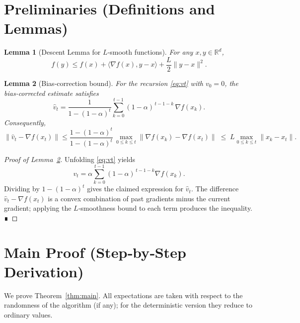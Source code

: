 \documentclass{article}
\newtheorem{lemma}{Lemma}
\begin{document}
\newpage
\section*{Preliminaries (Definitions and Lemmas)}
\begin{lemma}[Descent Lemma for $L$‑smooth functions]\label{lem:descent}
For any $x,y\in\mathbb{R}^d$,
\[
    f(y)\le f(x)+\langle\nabla f(x),y-x\rangle+\frac{L}{2}\|y-x\|^2 .
\]
\end{lemma}
\begin{lemma}[Bias‑correction bound]\label{lem:bias}
For the recursion \eqref{eq:vt} with $v_0=0$, the bias‑corrected estimate satisfies
\[
    \hat v_t = \frac{1}{1-(1-\alpha)^t}\sum_{k=0}^{t-1}(1-\alpha)^{\,t-1-k}\,\nabla f(x_k).
\]
Consequently,
\[
    \|\hat v_t-\nabla f(x_t)\|\le
    \frac{1-(1-\alpha)^{t}}{1-(1-\alpha)^{t}}\,
    \max_{0\le k\le t}\|\nabla f(x_k)-\nabla f(x_t)\|
    \;\le\; L\max_{0\le k\le t}\|x_k-x_t\|.
\]
\end{lemma}
\begin{proof}[Proof of Lemma~\ref{lem:bias}]
Unfolding \eqref{eq:vt} yields
\[
    v_t=\alpha\sum_{k=0}^{t-1}(1-\alpha)^{\,t-1-k}\nabla f(x_k).
\]
Dividing by $1-(1-\alpha)^t$ gives the claimed expression for $\hat v_t$.
The difference $\hat v_t-\nabla f(x_t)$ is a convex combination of past gradients
minus the current gradient; applying the $L$‑smoothness bound to each term
produces the inequality. ∎
\end{proof}

\section*{Main Proof (Step‑by‑Step Derivation)}
We prove Theorem~\ref{thm:main}.  
All expectations are taken with respect to the randomness of the algorithm (if any); for the deterministic version they reduce to ordinary values.
\end{document}
